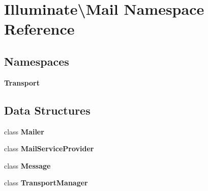 \section{Illuminate\textbackslash{}Mail Namespace Reference}
\label{namespace_illuminate_1_1_mail}
\subsection*{Namespaces}
\begin{DoxyCompactItemize}
\item 
 {\bf Transport}
\end{DoxyCompactItemize}
\subsection*{Data Structures}
\begin{DoxyCompactItemize}
\item 
class {\bf Mailer}
\item 
class {\bf Mail\+Service\+Provider}
\item 
class {\bf Message}
\item 
class {\bf Transport\+Manager}
\end{DoxyCompactItemize}

